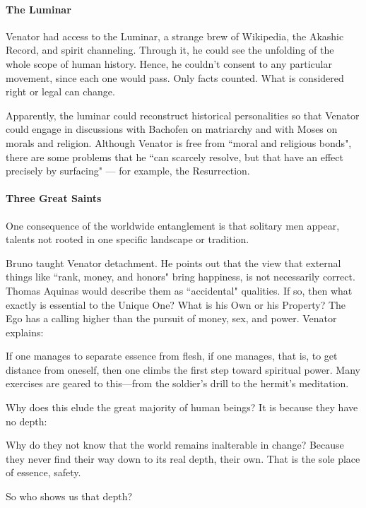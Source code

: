 \paragraph{The Luminar}
Venator had access to the Luminar, a strange brew of Wikipedia, the Akashic Record, and spirit channeling. Through it, he could see the unfolding of the whole scope of human history. Hence, he couldn't consent to any particular movement, since each one would pass. Only facts counted. What is considered right or legal can change.

Apparently, the luminar could reconstruct historical personalities so that Venator could engage in discussions with Bachofen on matriarchy and with Moses on morals and religion. Although Venator is free from ``moral and religious bonds", there are some problems that he ``can scarcely resolve, but that have an effect precisely by surfacing" — for example, the Resurrection.

\paragraph{Three Great Saints}
\begin{quotex}
One consequence of the worldwide entanglement is that solitary men appear, talents not rooted in one specific landscape or tradition. 

\end{quotex}
Bruno taught Venator detachment. He points out that the view that external things like ``rank, money, and honors" bring happiness, is not necessarily correct. Thomas Aquinas would describe them as ``accidental" qualities. If so, then what exactly is essential to the Unique One? What is his Own or his Property? The Ego has a calling higher than the pursuit of money, sex, and power. Venator explains:

\begin{quotex}
If one manages to separate essence from flesh, if one manages, that is, to get distance from oneself, then one climbs the first step toward spiritual power. Many exercises are geared to this—from the soldier's drill to the hermit's meditation. 

\end{quotex}
Why does this elude the great majority of human beings? It is because they have no depth:

\begin{quotex}
Why do they not know that the world remains inalterable in change? Because they never find their way down to its real depth, their own. That is the sole place of essence, safety. 

\end{quotex}
So who shows us that depth?

